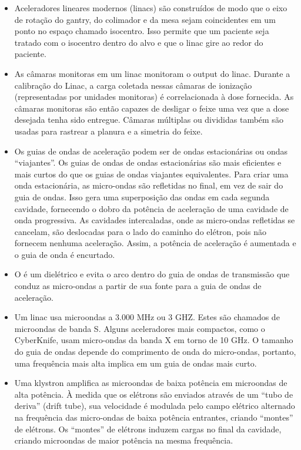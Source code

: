 \documentclass[11pt,a4paper]{article}
\newcounter{exemplo}
\begin{document}
\begin{exemplo}
\begin{itemize}
		\item Aceleradores lineares modernos (linacs) são construídos de modo que o eixo de rotação do gantry, do colimador e da mesa sejam coincidentes em um ponto no espaço chamado isocentro. Isso permite que um paciente seja tratado com o isocentro dentro do alvo e que o linac gire ao redor do paciente.
		
		\item As câmaras monitoras em um linac monitoram o output do linac. Durante a calibração do Linac, a carga coletada nessas câmaras de ionização (representadas por unidades monitoras) é correlacionada à dose fornecida. As câmaras monitoras são então capazes de desligar o feixe uma vez que a dose desejada tenha sido entregue. Câmaras múltiplas ou divididas também são usadas para rastrear a planura e a simetria do feixe.
		
		\item Os guias de ondas de aceleração podem ser de ondas estacionárias ou ondas ``viajantes''. Os guias de ondas de ondas estacionárias são mais eficientes e mais curtos do que os guias de ondas viajantes equivalentes. Para criar uma onda estacionária, as micro-ondas são refletidas no final, em vez de sair do guia de ondas. Isso gera uma superposição das ondas em cada segunda cavidade, fornecendo o dobro da potência de aceleração de uma cavidade de onda progressiva. As cavidades intercaladas, onde as micro-ondas refletidas se cancelam, são deslocadas para o lado do caminho do elétron, pois não fornecem nenhuma aceleração. Assim, a potência de aceleração é aumentada e o guia de onda é encurtado.
		
		\item O  é um dielétrico e evita o arco dentro do guia de ondas de transmissão que conduz as micro-ondas a partir de sua fonte para a guia de ondas de aceleração.
		
		\item Um linac usa microondas a 3.000 MHz ou 3 GHZ. Estes são chamados de microondas de banda S. Alguns aceleradores mais compactos, como o CyberKnife, usam micro-ondas da banda X em torno de 10 GHz. O tamanho do guia de ondas depende do comprimento de onda do micro-ondas, portanto, uma frequência mais alta implica em um guia de ondas mais curto.
		
		\item Uma klystron amplifica as microondas de baixa potência em microondas de alta potência. À medida que os elétrons são enviados através de um ``tubo de deriva'' (drift tube), sua velocidade é modulada pelo campo elétrico alternado na frequência das micro-ondas de baixa potência entrantes, criando “montes” de elétrons. Os “montes” de elétrons induzem cargas no final da cavidade, criando microondas de maior potência na mesma frequência.
		

\end{itemize}
\end{exemplo}
\end{document}
